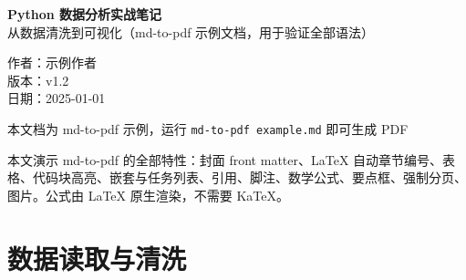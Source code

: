 \documentclass[zihao=-4]{ctexart}
\numberwithin{equation}{section}
\numberwithin{figure}{section}
\numberwithin{table}{section}
\theoremstyle{plain}
\begin{document}
\begin{titlepage}

\pagecolor{coverbg}

\thispagestyle{empty}

\color{black}

\centering

\vspace*{0.30\textheight}

{\bfseries Python 数据分析实战笔记}\\[0.9em]

{ 从数据清洗到可视化（md-to-pdf 示例文档，用于验证全部语法）}\\[3.2em]

\vfill

{ 作者：示例作者}\\[0.7em]

{ 版本：v1.2}\\[0.7em]

{ 日期：2025-01-01}\\[0.7em]

\vspace{0.5em}

\vfill

{\color{black!70} 本文档为 md-to-pdf 示例，运行 \texttt{md-to-pdf example.md} 即可生成 PDF}\\[1.0em]

\vspace*{1.1cm}

\end{titlepage}

\nopagecolor

\setcounter{page}{1}


\tableofcontents

\clearpage


\setcounter{page}{1}

\begin{keybox}[使用说明]
本文演示 md-to-pdf 的全部特性：封面 front matter、LaTeX 自动章节编号、表格、代码块高亮、嵌套与任务列表、引用、脚注、数学公式、要点框、强制分页、图片。公式由 LaTeX 原生渲染，不需要 KaTeX。
\end{keybox}

\section{数据读取与清洗}
\end{document}
